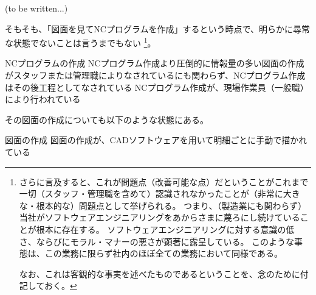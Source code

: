 (to be written...)



\clearpage
そもそも、「図面を見てNCプログラムを作成」するという時点で、明らかに尋常な状態でないことは言うまでもない
\footnote{さらに言及すると、これが問題点（改善可能な点）だということがこれまで一切（スタッフ・管理職を含めて）認識されなかったことが（非常に大きな・根本的な）問題点として挙げられる。
つまり、（製造業にも関わらず）当社がソフトウェアエンジニアリングをあからさまに蔑ろにし続けていることが根本に存在する。
ソフトウェアエンジニアリングに対する意識の低さ、ならびにモラル・マナーの悪さが顕著に露呈している。
このような事態は、この業務に限らず社内のほぼ全ての業務において同様である。

なお、これは客観的な事実を述べたものであるということを、念のために付記しておく。}。
\begin{Issues}{NCプログラムの作成}
NCプログラム作成より圧倒的に情報量の多い図面の作成がスタッフまたは管理職によりなされているにも関わらず、NCプログラム作成はその後工程としてなされている
\tcbline*
NCプログラム作成が、現場作業員（一般職）により行われている
\end{Issues}
その図面の作成についても以下のような状態にある。
\begin{Issues}{図面の作成}
図面の作成が、CADソフトウェアを用いて明細ごとに手動で描かれている
\end{Issues}
